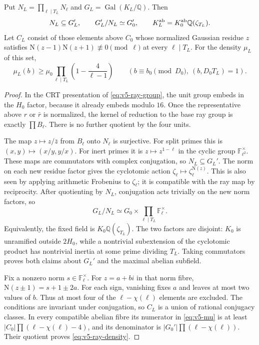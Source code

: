 \begin{lemma}
\label{lem:v5-ray-fibres}
Put $N_L=\prod_{\ell\mid T_L}N_\ell$ and
$G_L=\operatorname{Gal}(K_L/\mathbb Q)$.
Then
\[
 N_L\subseteq G_L',\qquad
 G_L'/N_L\simeq G_0',\qquad
 K_L^{\rm ab}=K_0^{\rm ab}\mathbb Q(\zeta_{T_L}).
\]
Let $C_L$ consist of those elements above $C_0$ whose normalized Gaussian
residue $z$ satisfies $\mathrm N(z-1)\mathrm N(z+1)\not\equiv0\pmod\ell$
at every $\ell\mid T_L$. For the density $\mu_L$ of this set,
\begin{equation}\label{eq:v5-ray-density}
 \mu_L(b)\geq\mu_0
       \prod_{\ell\mid T_L}\left(1-\frac4{\ell-1}\right)
 \qquad (b\equiv b_0\pmod{D_0},\ (b,D_0T_L)=1).
\end{equation}
\end{lemma}
\begin{proof}
In the CRT presentation of \eqref{eq:v5-ray-group}, the unit group
embeds in the $H_0$ factor, because it already embeds modulo $16$.
Once the representative above $r$ or $\bar r$ is normalized, the kernel
of reduction to the base ray group is exactly $\prod B_\ell$.
There is no further quotient by the four units.

The map $z\mapsto z/\bar z$ from $B_\ell$ onto $N_\ell$ is surjective.
For split primes this is $(x,y)\mapsto(x/y,y/x)$.
For inert primes it is $z\mapsto z^{1-\ell}$ in the cyclic group
$\mathbb F_{\ell^2}^\times$.
These maps are commutators with complex conjugation, so $N_L\subseteq G_L'$.
The norm on each new residue factor gives the cyclotomic action
$\zeta_\ell\mapsto\zeta_\ell^{\mathrm N(z)}$.
This is also seen by applying arithmetic Frobenius to $\zeta_\ell$;
it is compatible with the ray map by reciprocity.
After quotienting by $N_L$, conjugation acts trivially on the new norm
factors, so
\[
 G_L/N_L\simeq G_0\times\prod_{\ell\mid T_L}\mathbb F_\ell^\times.
\]
Equivalently, the fixed field is $K_0\mathbb Q(\zeta_{T_L})$.
The two factors are disjoint: $K_0$ is unramified outside $2H_0$, while
a nontrivial subextension of the cyclotomic product has nontrivial inertia
at some prime dividing $T_L$. Taking commutators proves both claims about
$G_L'$ and the maximal abelian subfield.

Fix a nonzero norm $s\in\mathbb F_\ell^\times$.
For $z=a+bi$ in that norm fibre,
$\mathrm N(z\pm1)=s+1\pm2a$.
For each sign, vanishing fixes $a$ and leaves at most two values of $b$.
Thus at most four of the $\ell-\chi(\ell)$ elements are excluded.
The conditions are invariant under conjugation, so $C_L$ is a union of
rational conjugacy classes.
In every compatible abelian fibre its numerator in \eqref{eq:v5-mu} is
at least $|C_0|\prod(\ell-\chi(\ell)-4)$, and its denominator is
$|G_0'|\prod(\ell-\chi(\ell))$.
Their quotient proves \eqref{eq:v5-ray-density}.
\end{proof}

